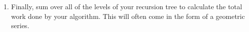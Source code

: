 \documentclass[11pt]{article}
\newcommand{\bigo}{\mathcal{O}}
\begin{document}
\begin{enumerate}
\begin{enumerate}
        \item Finally, sum over all of the levels of your recursion tree to calculate the total work done by your algorithm. This will often come in the form of a geometric series.
    \end{enumerate}
\end{enumerate}




\end{document}
